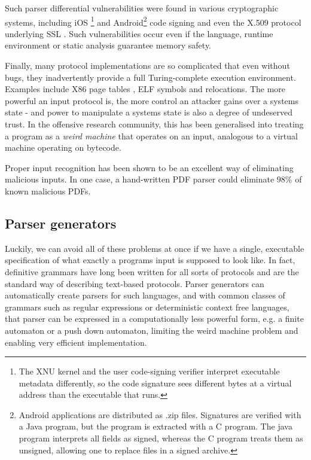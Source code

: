Such parser differential vulnerabilities were found in various cryptographic systems, including  iOS
\footnote{The XNU kernel and the user code-signing verifier interpret executable metadata
  differently, so the code signature sees different bytes at a virtual address than the executable
  that runs.}\cite{evaders6} and Android\footnote{Android applications are distributed as .zip
  files. Signatures are verified with a Java program, but the program is extracted with a C program.
The java program interprets all fields as signed, whereas the C program treats them as unsigned,
allowing one to replace files in a signed archive.}
\cite{saurik-masterkey} code signing and even the
X.509 protocol underlying SSL \cite{DBLP:conf/fc/KaminskyPS10}. Such vulnerabilities occur even if the language,
runtime environment or static analysis guarantee memory safety.

Finally, many protocol implementations are so complicated that even without bugs, they inadvertently
provide a full Turing-complete execution environment. Examples include X86 page tables
\cite{bangert2013page}, ELF symbols and relocations\cite{shapiro2013weird}.  
The more powerful an input
protocol is, the more control an attacker gains over a systems state - and power to manipulate a
systems state is also a degree of undeserved trust. In the offensive research community, this has
been generalised into treating a program as a \textit{weird machine}\cite{bratus2011exploit} that
operates on an input, analogous to a virtual machine operating on bytecode.

Proper input recognition has been shown to be an excellent way of eliminating malicious inputs. In
one case, a hand-written PDF parser could eliminate $98\%$ of known malicious PDFs\cite{Bogk-PDF}.


\subsection{Parser generators}
Luckily, we can avoid all of these problems at once if we have a single, executable specification of
what exactly a programs input is supposed to look like. In fact, definitive grammars have long
been written for all sorts of protocols and are the standard way of describing text-based protocols.
Parser generators can automatically create parsers for such languages, and with common classes of
grammars such as regular expressions or deterministic context free languages, that parser can be
expressed in a computationally less powerful form, e.g. a finite automaton or a push down automaton,
limiting the weird machine problem and enabling very efficient implementation. \cite{Knuth1965607}


